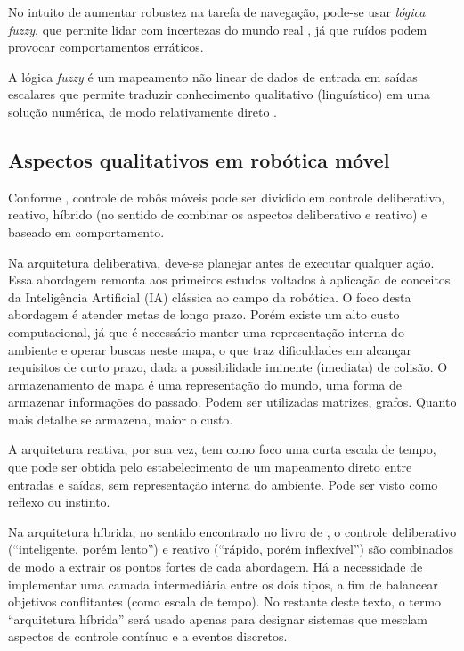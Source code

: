No intuito de aumentar robustez na tarefa de navegação, pode-se usar
\textit{lógica fuzzy}, que permite lidar com incertezas do mundo real
\cite{inbook:FuzzyNavigationIntech}, já que ruídos podem provocar comportamentos
erráticos.

A lógica \textit{fuzzy} é um mapeamento não linear de dados de entrada em saídas
escalares que permite traduzir conhecimento qualitativo (linguístico) em uma
solução numérica, de modo relativamente direto \cite{Art_Mendel}. 

\subsection{Aspectos qualitativos em robótica móvel \label{SEC:SUBSUNCAO}}

Conforme , controle de robôs móveis pode ser
dividido em controle deliberativo, reativo, híbrido (no sentido de
combinar os aspectos deliberativo e reativo) e baseado em comportamento.

Na arquitetura deliberativa, deve-se planejar antes de executar qualquer
ação. Essa abordagem remonta aos primeiros estudos voltados à aplicação de
conceitos da Inteligência Artificial (IA) clássica ao campo da robótica. O foco
desta abordagem é atender metas de longo prazo. Porém existe um alto custo 
computacional, já que é necessário manter uma representação interna do ambiente 
e operar buscas neste mapa, o que traz dificuldades em alcançar requisitos de curto 
prazo, dada a possibilidade iminente (imediata) de colisão. O armazenamento de mapa
é uma representação do mundo, uma forma de armazenar informações do passado. Podem ser
utilizadas matrizes, grafos. Quanto mais detalhe se armazena, maior o custo.

A arquitetura reativa, por sua vez, tem como foco uma curta escala de tempo, que
pode ser obtida pelo estabelecimento de um mapeamento direto entre entradas e
saídas, sem representação interna do ambiente. Pode ser visto como reflexo ou
instinto. 

Na arquitetura híbrida, no sentido encontrado no livro de
, o controle deliberativo (``inteligente, porém
lento'') e reativo (``rápido, porém inflexível'') são combinados de modo a
extrair os pontos fortes de cada abordagem. Há a necessidade de implementar uma
camada intermediária entre os dois tipos, a fim de balancear objetivos
conflitantes (como escala de tempo). No restante deste texto, o termo
``arquitetura híbrida'' será usado apenas para designar sistemas que mesclam
aspectos de controle contínuo e a eventos discretos.  

